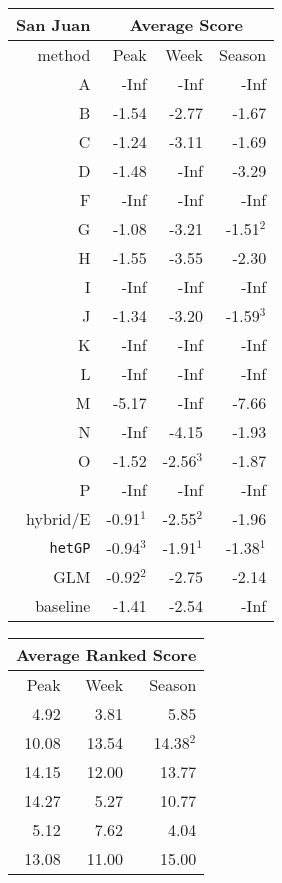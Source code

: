 \documentclass[12pt]{article}
\begin{document}
\begin{table}[ht!]
\footnotesize
\begin{minipage}{6.25cm}
\begin{tabular}{r|rrr}
 San Juan & \multicolumn{3}{c}{Average Score} \\
  \hline
 method & Peak & Week & Season \\ 
  \hline
  A & -Inf & -Inf & -Inf \\ 
  B & -1.54 & -2.77 & -1.67 \\ 
  C & -1.24 & -3.11 & -1.69 \\ 
  D & -1.48 & -Inf & -3.29 \\ 
  F & -Inf & -Inf & -Inf \\ 
  G & -1.08 & -3.21 & -1.51$^2$ \\ 
  H & -1.55 & -3.55 & -2.30 \\ 
  I & -Inf & -Inf & -Inf \\ 
  J & -1.34 & -3.20 & -1.59$^3$ \\ 
  K & -Inf & -Inf & -Inf \\ 
  L & -Inf & -Inf & -Inf \\ 
  M & -5.17 & -Inf & -7.66 \\ 
  N & -Inf & -4.15 & -1.93 \\ 
  O & -1.52 &  -2.56$^3$ & -1.87 \\ 
  P & -Inf & -Inf & -Inf \\ 
  hybrid/E & -0.91$^1$ & -2.55$^2$ & -1.96 \\ 
  {\tt hetGP}  & -0.94$^3$ & -1.91$^1$ & -1.38$^1$ \\ 
  GLM & -0.92$^2$ & -2.75 & -2.14 \\ 
  baseline & -1.41 & -2.54 & -Inf \\ 
   \hline
\end{tabular}
\end{minipage}
\hfill
\begin{minipage}{4.5cm}
\begin{tabular}{rrr}
 \multicolumn{3}{c}{Average Ranked Score} \\
  \hline
  Peak & Week & Season \\ 
  \hline
  4.92 & 3.81 & 5.85 \\ 
  10.08 & 13.54 & 14.38$^2$ \\ 
  14.15 & 12.00 & 13.77 \\ 
  14.27 & 5.27 & 10.77 \\ 
  5.12 & 7.62 & 4.04 \\ 
  13.08 & 11.00 & 15.00 \\ 

\end{tabular}
\end{minipage}
\end{table}
\end{document}
